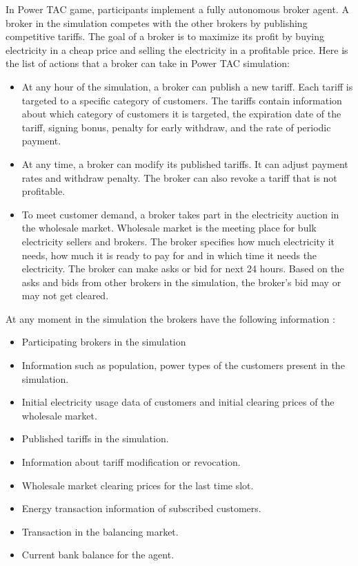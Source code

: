 In Power TAC game, participants implement a fully autonomous broker agent. A broker in the simulation competes with the other brokers by publishing competitive tariffs. The goal of a broker is to maximize its profit by buying electricity in a cheap price and selling the electricity in a profitable price. Here is the list of actions that a broker can take in Power TAC simulation:
\begin{itemize}  
\item At any hour of the simulation, a broker can publish a new tariff. Each tariff is targeted to a specific category of customers. The tariffs contain information about which category of customers it is targeted, the expiration date of the tariff, signing bonus, penalty for early withdraw, and the rate of periodic payment. 
\item At any time, a broker can modify its published tariffs. It can adjust payment rates and withdraw penalty. The broker can also revoke a tariff that is not profitable.
\item To meet customer demand, a broker takes part in the electricity auction in the wholesale market. Wholesale market is the meeting place for bulk electricity sellers and brokers. The broker specifies how much electricity it needs, how much it is ready to pay for and in which time it needs the electricity. The broker can make asks or bid for next 24 hours. Based on the asks and bids from other brokers in the simulation, the broker's bid may or may not get cleared. 
\end{itemize}

At any moment in the simulation the brokers have the following information : 
\begin{itemize}  
\item Participating brokers in the simulation 
\item Information such as population, power types of the customers present in the simulation.
\item Initial electricity usage data of customers and initial clearing prices of the wholesale market.
\item Published tariffs in the simulation.
\item Information about tariff modification or revocation.
\item Wholesale market clearing prices for the last time slot.
\item Energy transaction information of subscribed customers.
\item Transaction in the balancing market.
\item Current bank balance for the agent.
\end{itemize}


